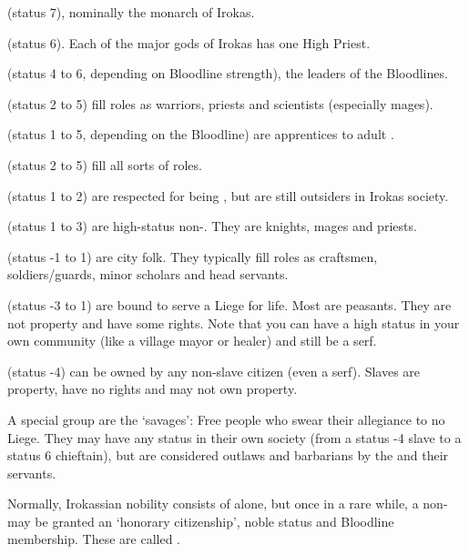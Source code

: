 \bd
  \item[\DragonKing{}] (status 7), nominally the monarch of Irokas. 
  \item[\introi{High Priests}{High Priests!in Irokas}] (status 6). Each of the major gods of Irokas has one High Priest. 
  \item[\Dragonlords{}] (status 4 to 6, depending on Bloodline strength), the leaders of the Bloodlines. 
  \item[Adult \dragons{}] (status 2 to 5) fill roles as warriors, priests and scientists (especially mages). 
  \item[\Draconic{} children] (status 1 to 5, depending on the Bloodline) are apprentices to adult \dragons{}. 
  \item[\Dragonbrothers{}] (status 2 to 5) fill all sorts of roles. 
  \item[Outlander \dragons{}] (status 1 to 2) are respected for being \dragons{}, but are still outsiders in Irokas society. 
  \item[\introi{Vassals}{Vassals!in Irokas}] (status 1 to 3) are high-status non-\dragons{}. They are knights, mages and priests. 
  \item[\introi{Freemen}{Freemen!in Irokas}] (status -1 to 1) are city folk. They typically fill roles as craftsmen, soldiers/guards, minor scholars and head servants. 
  \item[\introi{Serfs}{Serfs!in Irokas}] (status -3 to 1) are bound to serve a \draconic{} Liege for life. Most are peasants. They are not property and have some rights. Note that you can have a high status in your own community (like a village mayor or healer) and still be a serf. 
  \item[\introi{Slaves}{Slaves!in Irokas}] (status -4) can be owned by any non-slave citizen (even a serf). Slaves are property, have no rights and may not own property. 
\ed

A special group are the `savages': Free people who swear their allegiance to no \dragon{} Liege. They may have any status in their own society (from a status -4 slave to a status 6 chieftain), but are considered outlaws and barbarians by the \dragons{} and their servants. 



Normally, Irokassian nobility consists of \dragons{} alone, but once in a rare while, a non-\dragon{} may be granted an `honorary citizenship', noble status and Bloodline membership. These are called \dragonbrothers{}. 

